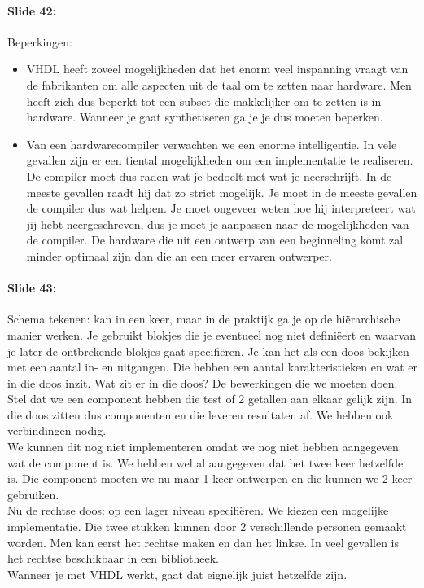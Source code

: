 \documentclass[10pt,a4paper]{book}
\begin{document}
\paragraph{Slide 42:} Beperkingen:
\begin{itemize}
\item VHDL heeft zoveel mogelijkheden dat het enorm veel inspanning vraagt van de fabrikanten om alle aspecten uit de taal om te zetten naar hardware. Men heeft zich dus beperkt tot een subset die makkelijker om te zetten is in hardware. Wanneer je gaat synthetiseren ga je je dus moeten beperken.
\item Van een hardwarecompiler verwachten we een enorme intelligentie. In vele gevallen zijn er een tiental mogelijkheden om een implementatie te realiseren. De compiler moet dus raden wat je bedoelt met wat je neerschrijft. In de meeste gevallen raadt hij dat zo strict mogelijk. Je moet in de meeste gevallen de compiler dus wat helpen. Je moet ongeveer weten hoe hij interpreteert wat jij hebt neergeschreven, dus je moet je aanpassen naar de mogelijkheden van de compiler. De hardware die uit een ontwerp van een beginneling komt zal minder optimaal zijn dan die an een meer ervaren ontwerper.
\end{itemize}

\paragraph{Slide 43:} Schema tekenen: kan in een keer, maar in de praktijk ga je op de hi\"erarchische manier werken. Je gebruikt blokjes die je eventueel nog niet defini\"eert en waarvan je later de ontbrekende blokjes gaat specifi\"eren. Je kan het als een doos bekijken met een aantal in- en uitgangen. Die hebben een aantal karakteristieken en wat er in die doos inzit. Wat zit er in die doos? De bewerkingen die we moeten doen. Stel dat we een component hebben die test of 2 getallen aan elkaar gelijk zijn. In die doos zitten dus componenten en die leveren resultaten af. We hebben ook verbindingen nodig.\\
We kunnen dit nog niet implementeren omdat we nog niet hebben aangegeven wat de component is. We hebben wel al aangegeven dat het twee keer hetzelfde is. Die component moeten we nu maar 1 keer ontwerpen en die kunnen we 2 keer gebruiken.\\
Nu de rechtse doos: op een lager niveau specifi\"eren. We kiezen een mogelijke implementatie. Die twee stukken kunnen door 2 verschillende personen gemaakt worden. Men kan eerst het rechtse maken en dan het linkse. In veel gevallen is het rechtse beschikbaar in een bibliotheek.\\
Wanneer je met VHDL werkt, gaat dat eignelijk juist hetzelfde zijn.
\end{document}
